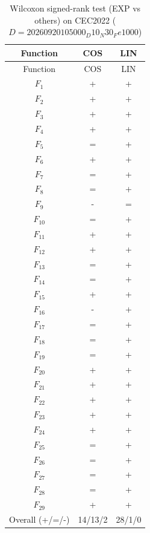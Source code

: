 \begin{center}
\small
\renewcommand{\arraystretch}{1.25}
\begin{longtable}{ccc}
\caption{Wilcoxon signed-rank test (EXP vs others) on CEC2022 ($D=20260920105000_D10_N30_Fe1000$) }
\label{tab:wilcoxon_CEC2022_20260920105000_D10_N30_Fe1000} \\
\toprule
Function & COS & LIN \\
\midrule
\endfirsthead
\toprule
Function & COS & LIN \\
\midrule
\endhead
$F_{1}$ & + & + \\
$F_{2}$ & + & + \\
$F_{3}$ & + & + \\
$F_{4}$ & + & + \\
$F_{5}$ & = & + \\
$F_{6}$ & + & + \\
$F_{7}$ & = & + \\
$F_{8}$ & = & + \\
$F_{9}$ & - & = \\
$F_{10}$ & = & + \\
$F_{11}$ & + & + \\
$F_{12}$ & + & + \\
$F_{13}$ & = & + \\
$F_{14}$ & = & + \\
$F_{15}$ & + & + \\
$F_{16}$ & - & + \\
$F_{17}$ & = & + \\
$F_{18}$ & = & + \\
$F_{19}$ & = & + \\
$F_{20}$ & + & + \\
$F_{21}$ & + & + \\
$F_{22}$ & + & + \\
$F_{23}$ & + & + \\
$F_{24}$ & + & + \\
$F_{25}$ & = & + \\
$F_{26}$ & = & + \\
$F_{27}$ & = & + \\
$F_{28}$ & = & + \\
$F_{29}$ & + & + \\
\midrule
Overall (+/=/-) & 14/13/2 & 28/1/0 \\
\bottomrule
\end{longtable}
\end{center}
